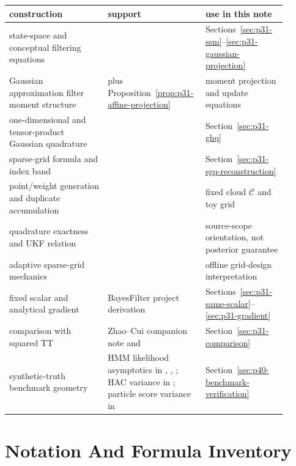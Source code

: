 \documentclass[11pt]{article}
\numberwithin{equation}{section}
\begin{document}
\begin{center}
\small
\begin{tabular}{p{0.34\linewidth}p{0.28\linewidth}p{0.28\linewidth}}
\toprule
construction & support & use in this note \\
\midrule
state-space and conceptual filtering equations & \citet[Section 2]{jia2012sparsegrid} & Sections~\ref{sec:p31-ssm}--\ref{sec:p31-gaussian-projection} \\
Gaussian approximation filter moment structure & \citet[Eq. 15--23]{jia2012sparsegrid} plus Proposition~\ref{prop:p31-affine-projection} & moment projection and update equations \\
one-dimensional and tensor-product Gaussian quadrature & \citet[Section 2.2.1]{jia2012sparsegrid} & Section~\ref{sec:p31-ghq} \\
sparse-grid formula and index band & \citet[Eq. 26--29]{jia2012sparsegrid} & Section~\ref{sec:p31-sgq-reconstruction} \\
point/weight generation and duplicate accumulation & \citet[Algorithm 1]{jia2012sparsegrid} & fixed cloud \(\mathcal C\) and toy grid \\
quadrature exactness and UKF relation & \citet[Theorems 3.1--3.2]{jia2012sparsegrid} & source-scope orientation, not posterior guarantee \\
adaptive sparse-grid mechanics & \citet[Section 3]{singh2018adaptive} & offline grid-design interpretation \\
fixed scalar and analytical gradient & BayesFilter project derivation & Sections~\ref{sec:p31-same-scalar}--\ref{sec:p31-gradient} \\
comparison with squared TT & Zhao--Cui companion note and \citet{zhao2024ttsequential} & Section~\ref{sec:p31-comparison} \\
synthetic-truth benchmark geometry & HMM likelihood asymptotics in \citet{cappe2005hmm}, \citet{douc2004markovregime}, \citet{douc2011consistencyhmm}; HAC variance in \citet{neweywest1987}; particle score variance in \citet{poyiadjis2011particle,nemeth2013particle} & Section~\ref{sec:p40-benchmark-verification} \\
\bottomrule
\end{tabular}
\end{center}

\section{Notation And Formula Inventory}
\label{sec:p32-final-inventory}
\end{document}

